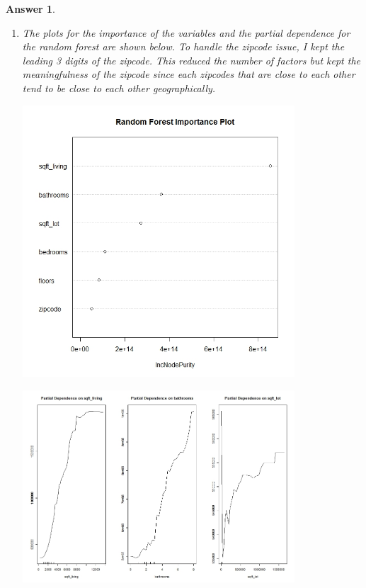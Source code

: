 \documentclass[12pt]{article}
\theoremstyle{colon}
\newtheorem*{answer}{Answer}
\begin{document}
\begin{answer}
\begin{enumerate}[label=\arabic*)]
    \item The plots for the importance of the variables and the partial dependence for the random forest are shown below. To handle the zipcode issue, I kept the leading 3 digits of the zipcode. This reduced the number of factors but kept the meaningfulness of the zipcode since each zipcodes that are close to each other tend to be close to each other geographically.

      \begin{center}
        \includegraphics[width=0.8\textwidth]{14_important.jpg}
      \end{center}

      \begin{center}
        \includegraphics[width=0.8\textwidth]{14_partial.jpg}
      \end{center}


\end{enumerate}
\end{answer}
\end{document}
